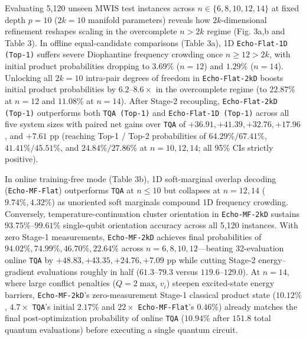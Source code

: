 \documentclass[10pt,a4paper]{article}
\begin{document}
Evaluating 5,120 unseen MWIS test instances across $n \in \{6, 8, 10, 12, 14\}$ at fixed depth $p = 10$ ($2k = 10$ manifold parameters) reveals how $2k$-dimensional refinement reshapes scaling in the overcomplete $n > 2k$ regime (Fig. 3a,b and Table 3). In offline equal-candidate comparisons (Table 3a), 1D \texttt{Echo-Flat-1D (Top-1)} suffers severe Diophantine frequency crowding once $n \ge 12 > 2k$, with initial product probabilities dropping to $3.69\%$ ($n=12$) and $1.29\%$ ($n=14$). Unlocking all $2k=10$ intra-pair degrees of freedom in \texttt{Echo-Flat-2kD} boosts initial product probabilities by $6.2\mbox{--}8.6\times$ in the overcomplete regime (to $22.87\%$ at $n=12$ and $11.08\%$ at $n=14$). After Stage-2 recoupling, \texttt{Echo-Flat-2kD (Top-1)} outperforms both \texttt{TQA (Top-1)} and \texttt{Echo-Flat-1D (Top-1)} across all five system sizes with paired net gains over \texttt{TQA} of $\mathbf{+36.91}, \mathbf{+41.39}, \mathbf{+32.76}, \mathbf{+17.96}$, and $\mathbf{+7.61}$ pp (reaching Top-1 / Top-2 probabilities of $\mathbf{64.29}\% / \mathbf{67.41}\%$, $\mathbf{41.41}\% / \mathbf{45.51}\%$, and $\mathbf{24.84}\% / \mathbf{27.86}\%$ at $n=10, 12, 14$; all 95\% CIs strictly positive).

In online training-free mode (Table 3b), 1D soft-marginal overlap decoding (\texttt{Echo-MF-Flat}) outperforms \texttt{TQA} at $n \le 10$ but collapses at $n=12, 14$ ($9.74\%, 4.32\%$) as unoriented soft marginals compound 1D frequency crowding. Conversely, temperature-continuation cluster orientation in \texttt{Echo-MF-2kD} sustains $93.75\%\mbox{--}99.61\%$ single-qubit orientation accuracy across all 5,120 instances. With zero Stage-1 measurements, \texttt{Echo-MF-2kD} achieves final probabilities of $\mathbf{94.02}\%, \mathbf{74.99}\%, \mathbf{46.70}\%, \mathbf{22.64}\%$ across $n=6, 8, 10, 12$---beating 32-evaluation online \texttt{TQA} by $\mathbf{+48.83}, \mathbf{+43.35}, \mathbf{+24.76}, \mathbf{+7.09}$ pp while cutting Stage-2 energy--gradient evaluations roughly in half ($\mathbf{61.3\mbox{--}79.3}$ versus $119.6\mbox{--}129.0$). At $n=14$, where large conflict penalties ($Q = 2\max_i v_i$) steepen excited-state energy barriers, \texttt{Echo-MF-2kD}'s zero-measurement Stage-1 classical product state ($\mathbf{10.12}\%$, $4.7\times$ \texttt{TQA}'s initial $2.17\%$ and $22\times$ \texttt{Echo-MF-Flat}'s $0.46\%$) already matches the final post-optimization probability of online \texttt{TQA} ($10.94\%$ after $151.8$ total quantum evaluations) before executing a single quantum circuit.
\end{document}
